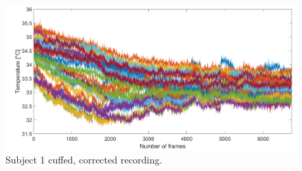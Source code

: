 \begin{figure}[htbp]
\begin{minipage}[b]{0.45\linewidth}
	\end{minipage}
	\hspace{0.2cm}
	\begin{minipage}[b]{0.45\linewidth}
		\centering
		\includegraphics[width=\linewidth]{figures/Recordings/Sub1_cuffed_corr}
		\caption{Subject 1 cuffed, corrected recording.}
		
	\end{minipage}
\end{figure}


